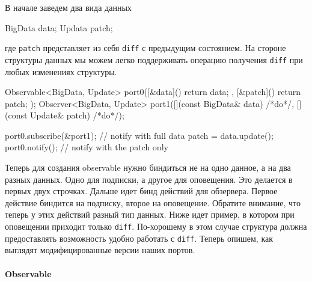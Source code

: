 В начале заведем два вида данных
\begin{cppcode}
BigData data;
Updata patch;
\end{cppcode}
где \verb"patch" представляет из себя \verb"diff" с предыдущим состоянием.
На стороне структуры данных мы можем легко поддерживать операцию получения \verb"diff" при любых изменениях структуры.
\begin{cppcode}
Observable<BigData, Update> port0([&data]() { return data; },
                                  [&patch]() { return patch; });
Observer<BigData, Update> port1([](const BigData& data){ /*do*/},
                                [](const Update& patch){ /*do*/});

port0.subscribe(&port1); // notify with full data
patch = data.update();
port0.notify(); // notify with the patch only
\end{cppcode}
Теперь для создания observable нужно биндиться не на одно данное, а на два разных данных.
Одно для подписки, а другое для оповещения.
Это делается в первых двух строчках.
Дальше идет бинд действий для обзервера.
Первое действие биндится на подписку, второе на оповещение.
Обратите внимание, что теперь у этих действий разный тип данных.
Ниже идет пример, в котором при оповещении приходит только \verb"diff".
По-хорошему в этом случае структура должна предоставлять возможность удобно работать с \verb"diff".
Теперь опишем, как выглядят модифицированные версии наших портов.

\paragraph{Observable}

